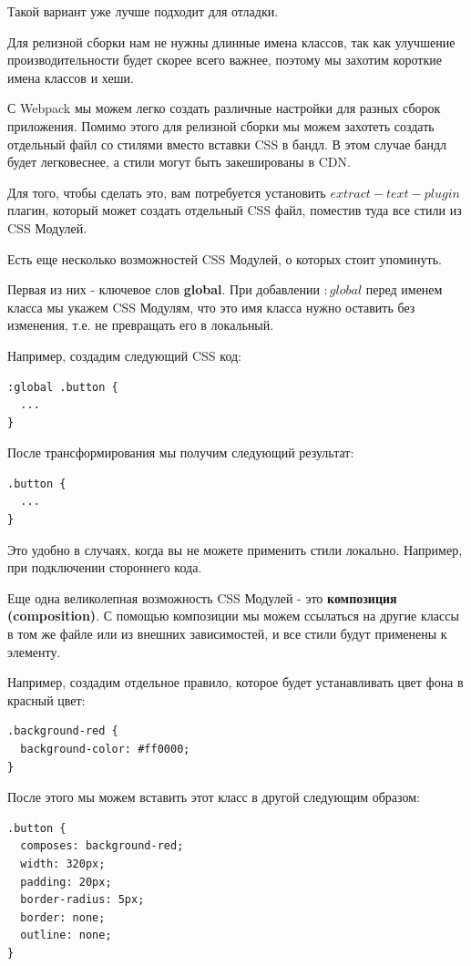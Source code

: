 Такой вариант уже лучше подходит для отладки.

Для релизной сборки нам не нужны длинные имена классов, так как улучшение производительности будет скорее всего важнее, поэтому мы захотим короткие имена классов и хеши.

С Webpack мы можем легко создать различные настройки для разных сборок приложения. Помимо этого для релизной сборки мы можем захотеть создать отдельный файл со стилями вместо вставки CSS в бандл. В этом случае бандл будет легковеснее, а стили могут быть закешированы в CDN.

Для того, чтобы сделать это, вам потребуется установить $extract-text-plugin$ плагин, который может создать отдельный CSS файл, поместив туда все стили из CSS Модулей.

Есть еще несколько возможностей CSS Модулей, о которых стоит упоминуть.

Первая из них - ключевое слов \textbf{global}. При добавлении $:global$ перед именем класса мы укажем CSS Модулям, что это имя класса нужно оставить без изменения, т.е. не превращать его в локальный.

Например, создадим следующий CSS код:

\begin{lstlisting}
:global .button {
  ...
}
\end{lstlisting}

После трансформирования мы получим следующий результат:

\begin{lstlisting}
.button {
  ...
}
\end{lstlisting}

Это удобно в случаях, когда вы не можете применить стили локально. Например, при подключении стороннего кода.

Еще одна великолепная возможность CSS Модулей - это \textbf{композиция (composition)}. С помощью композиции мы можем ссылаться на другие классы в том же файле или из внешних зависимостей, и все стили будут применены к элементу.

Например, создадим отдельное правило, которое будет устанавливать цвет фона в красный цвет:

\begin{lstlisting}
.background-red {
  background-color: #ff0000;
}
\end{lstlisting}

После этого мы можем вставить этот класс в другой следующим образом:

\begin{lstlisting}
.button {
  composes: background-red;
  width: 320px;
  padding: 20px;
  border-radius: 5px;
  border: none;
  outline: none;
}
\end{lstlisting}

